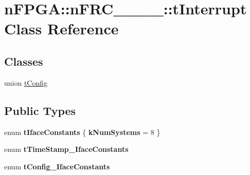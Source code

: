 \hypertarget{classnFPGA_1_1nFRC__2012__1__6__4_1_1tInterrupt}{
\section{nFPGA::nFRC\_\_\_\_::tInterrupt Class Reference}
\label{classnFPGA_1_1nFRC__2012__1__6__4_1_1tInterrupt}
}
\subsection*{Classes}
\begin{DoxyCompactItemize}
\item 
union \hyperlink{unionnFPGA_1_1nFRC__2012__1__6__4_1_1tInterrupt_1_1tConfig}{tConfig}
\end{DoxyCompactItemize}
\subsection*{Public Types}
\begin{DoxyCompactItemize}
\item 
enum {\bfseries tIfaceConstants} \{ {\bfseries kNumSystems} =  8
 \}
\item 
enum {\bfseries tTimeStamp\_\-IfaceConstants} 
\item 
enum {\bfseries tConfig\_\-IfaceConstants} 
\end{DoxyCompactItemize}
